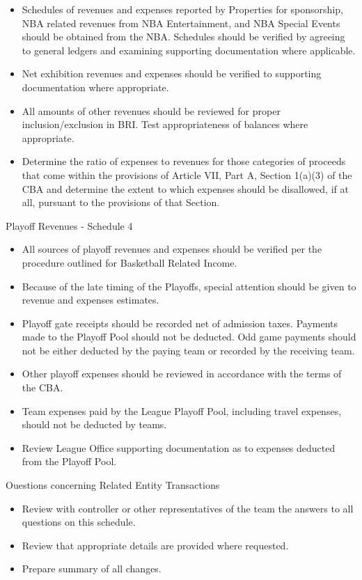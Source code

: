 \documentclass[
]{book}
\providecommand{\tightlist}{%
  \setlength{\itemsep}{0pt}\setlength{\parskip}{0pt}}
\begin{document}
\begin{itemize}
\item
  Schedules of revenues and expenses reported by Properties for sponsorship, NBA related revenues from NBA Entertainment, and NBA Special Events should be obtained from the NBA. Schedules should be verified by agreeing to general ledgers and examining supporting documentation where applicable.
\item
  Net exhibition revenues and expenses should be verified to supporting documentation where appropriate.
\item
  All amounts of other revenues should be reviewed for proper inclusion/exclusion in BRI. Test appropriateness of balances where appropriate.
\item
  Determine the ratio of expenses to revenues for those categories of proceeds that come within the provisions of Article VII, Part A, Section 1(a)(3) of the CBA and determine the extent to which expenses should be disallowed, if at all, pursuant to the provisions of that Section.
\end{itemize}

Playoff Revenues - Schedule 4

\begin{itemize}
\tightlist
\item
  All sources of playoff revenues and expenses should be verified per the procedure outlined for Basketball Related Income.
\item
  Because of the late timing of the Playoffs, special attention should be given to revenue and expenses estimates.
\item
  Playoff gate receipts should be recorded net of admission taxes. Payments made to the Playoff Pool should not be deducted. Odd game payments should not be either deducted by the paying team or recorded by the receiving team.
\item
  Other playoff expenses should be reviewed in accordance with the terms of the CBA.
\item
  Team expenses paid by the League Playoff Pool, including travel expenses, should not be deducted by teams.
\item
  Review League Office supporting documentation as to expenses deducted from the Playoff Pool.
\end{itemize}

Ouestions concerning Related Entity Transactions

\begin{itemize}
\tightlist
\item
  Review with controller or other representatives of the team the answers to all questions on this schedule.
\item
  Review that appropriate details are provided where requested.
\item
  Prepare summary of all changes.
\end{itemize}
\end{document}
